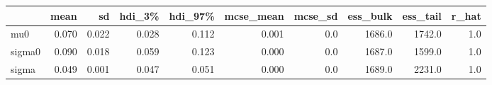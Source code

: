 \begin{tabular}{lrrrrrrrrr}
\toprule
{} &   mean &     sd &  hdi\_3\% &  hdi\_97\% &  mcse\_mean &  mcse\_sd &  ess\_bulk &  ess\_tail &  r\_hat \\
\midrule
mu0    &  0.070 &  0.022 &   0.028 &    0.112 &      0.001 &      0.0 &    1686.0 &    1742.0 &    1.0 \\
sigma0 &  0.090 &  0.018 &   0.059 &    0.123 &      0.000 &      0.0 &    1687.0 &    1599.0 &    1.0 \\
sigma  &  0.049 &  0.001 &   0.047 &    0.051 &      0.000 &      0.0 &    1689.0 &    2231.0 &    1.0 \\
\bottomrule
\end{tabular}
